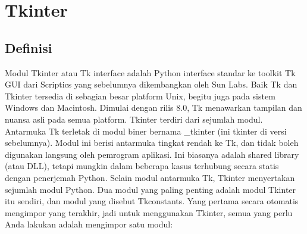 \section {Tkinter}

\subsection{Definisi}
\cite{lundh1999introduction} Modul Tkinter atau Tk interface adalah Python interface standar ke toolkit Tk GUI dari Scriptics yang sebelumnya dikembangkan oleh Sun Labs. Baik Tk dan Tkinter tersedia di sebagian besar platform Unix, begitu juga pada sistem Windows dan Macintosh. Dimulai dengan rilis 8.0, Tk menawarkan tampilan dan nuansa asli pada semua platform. Tkinter terdiri dari sejumlah modul. Antarmuka Tk terletak di modul biner bernama _tkinter (ini tkinter di versi sebelumnya). Modul ini berisi antarmuka tingkat rendah ke Tk, dan tidak boleh digunakan langsung oleh pemrogram aplikasi. Ini biasanya adalah shared library (atau DLL), tetapi mungkin dalam beberapa kasus terhubung secara statis dengan penerjemah Python. Selain modul antarmuka Tk, Tkinter menyertakan sejumlah modul Python. Dua modul yang paling penting adalah modul Tkinter itu sendiri, dan modul yang disebut Tkconstants. Yang pertama secara otomatis mengimpor yang terakhir, jadi untuk menggunakan Tkinter, semua yang perlu Anda lakukan adalah mengimpor satu modul: 

